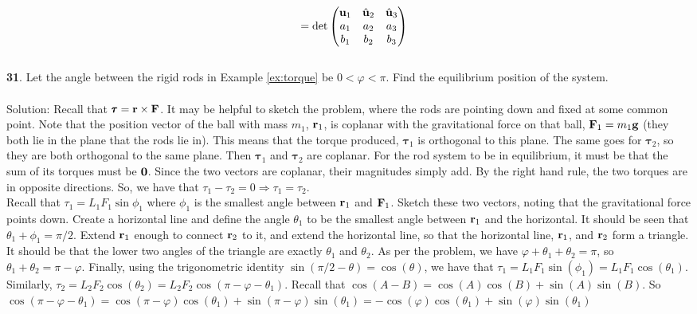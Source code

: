\documentclass[12pt]{amsbook}
\begin{document}
\begin{eqnarray*}
&&=\det\begin{pmatrix}{\bf u}_1&\hat{\bf u}_2&\hat{\bf u}_3 \\ a_1&a_2&a_3 \\ b_1&b_2&b_3 \end{pmatrix}\end{eqnarray*}
\\
{\small\bf 31}. Let the angle between the rigid rods 
in Example \ref{ex:torque} be $0<\varphi<\pi$.
Find the equilibrium position of the system.\\
\\
{\sc Solution}:
Recall that ${\pmb \tau}={\bf r}\times{\bf F}$. It may be helpful to sketch the problem, where the rods are pointing down and fixed at some common point. Note that the position vector of the ball with mass $m_1$, ${\bf r}_1$, is coplanar with the gravitational force on that ball, ${\bf F}_1=m_1{\bf g}$ (they both lie in the plane that the rods lie in). This means that the torque produced, ${\pmb \tau}_1$ is orthogonal to this plane. The same goes for ${\pmb \tau}_2$, so they are both orthogonal to the same plane. Then ${\pmb \tau}_1$ and ${\pmb \tau}_2$ are coplanar. For the rod system to be in equilibrium, it must be that the sum of its torques must be $\bf 0$. Since the two vectors are coplanar, their magnitudes simply add. By the right hand rule, the two torques are in opposite directions. So, we have that ${\tau}_1-{\tau}_2=0 \Rightarrow {\tau}_1={\tau}_2$.  
\\
Recall that ${\tau}_1=L_1F_1\sin\phi_1$ where $\phi_1$ is the smallest angle between ${\bf r}_1$ and ${\bf F}_1$. Sketch these two vectors, noting that the gravitational force points down. Create a horizontal line and define the angle $\theta_1$ to be the smallest angle between ${\bf r}_1$ and the horizontal. It should be seen that $\theta_1+\phi_1=\pi/2$. Extend ${\bf r}_1$ enough to connect ${\bf r}_2$ to it, and extend the horizontal line, so that the horizontal line, ${\bf r}_1$, and ${\bf r}_2$ form a triangle. It should be that the lower two angles of the triangle are exactly $\theta_1$ and $\theta_2$. As per the problem, we have $\varphi+\theta_1 + \theta_2=\pi$, so $\theta_1 + \theta_2=\pi-\varphi$. Finally, using the trigonometric identity $\sin(\pi/2-\theta)=\cos(\theta)$, we have that $\tau_1=L_1F_1\sin(\phi_1)=L_1F_1\cos(\theta_1)$. Similarly, $\tau_2=L_2F_2\cos(\theta_2)=L_2F_2\cos(\pi-\varphi-\theta_1)$. Recall that $\cos(A-B)=\cos(A)\cos(B)+\sin(A)\sin(B)$. So $\cos(\pi-\varphi-\theta_1)=\cos(\pi-\varphi)\cos(\theta_1)+\sin(\pi-\varphi)\sin(\theta_1)=-\cos(\varphi)\cos(\theta_1)+\sin(\varphi)\sin(\theta_1)$
\end{document}
